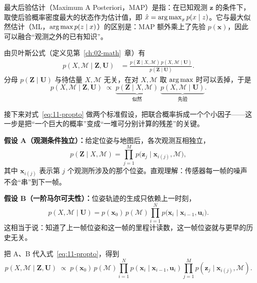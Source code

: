 \begin{definition}[最大后验估计]
最大后验估计（Maximum A Posteriori，MAP）是指：在已知观测 $\bm{z}$ 的条件下，取使后验概率密度最大的状态作为估计值，即 $\hat{x}=\operatorname*{arg\,max}_{x} p(x\mid z)$。它与最大似然估计（ML，$\operatorname*{arg\,max} p(z\mid x)$）的区别是：MAP 额外乘上了先验 $p(\bm{x})$，因此可以融合``观测之外的已有知识''。
\end{definition}

由贝叶斯公式（定义见第~\ref{ch:02-math}~章）有
\begin{align}
p(X,\mathcal{M}\mid \bm{Z},\bm{U})
  &= \frac{p(\bm{Z}\mid X,\mathcal{M})\,p(X,\mathcal{M}\mid\bm{U})}{p(\bm{Z}\mid\bm{U})}.
\label{eq:11-bayes-posterior}
\end{align}
分母 $p(\bm{Z}\mid\bm{U})$ 与待估量 $X,\mathcal{M}$ 无关，在对 $X,\mathcal{M}$ 取 $\operatorname*{arg\,max}$ 时可以丢掉，于是
\begin{equation}
p(X,\mathcal{M}\mid \bm{Z},\bm{U}) \;\propto\; \underbrace{p(\bm{Z}\mid X,\mathcal{M})}_{\text{似然}}\;\underbrace{p(X,\mathcal{M}\mid\bm{U})}_{\text{先验}}.
\label{eq:11-propto}
\end{equation}

接下来对式~\eqref{eq:11-propto} 做两个标准假设，把联合概率拆成一个个小因子——这一步是把``一个巨大的概率''变成``一堆可分别计算的残差''的关键。

\textbf{假设 A（观测条件独立）：}给定位姿与地图后，各次观测互相独立，
\begin{equation}
p(\bm{Z}\mid X,\mathcal{M})=\prod_{j=1}^{M}p\big(\bm{z}_j\mid \bm{x}_{i(j)},\mathcal{M}\big),
\end{equation}
其中 $\bm{x}_{i(j)}$ 表示第 $j$ 个观测所涉及的那个位姿。直观理解：传感器每一帧的噪声不会``串''到下一帧。

\textbf{假设 B（一阶马尔可夫性）：}位姿轨迹的生成只依赖上一时刻，
\begin{equation}
p(X,\mathcal{M}\mid\bm{U})=p(\bm{x}_0)\,p(\mathcal{M})\prod_{i=1}^{N}p\big(\bm{x}_i\mid\bm{x}_{i-1},\bm{u}_i\big).
\end{equation}
这相当于说：知道了上一帧位姿和这一帧的里程计读数，这一帧位姿就与更早的历史无关。

把 A、B 代入式~\eqref{eq:11-propto}，得到
\begin{equation}
p(X,\mathcal{M}\mid \bm{Z},\bm{U}) \;\propto\;
p(\bm{x}_0)\,p(\mathcal{M})\prod_{i=1}^{N}p(\bm{x}_i\mid\bm{x}_{i-1},\bm{u}_i)
\prod_{j=1}^{M}p(\bm{z}_j\mid\bm{x}_{i(j)},\mathcal{M}).
\label{eq:11-factorized}
\end{equation}

